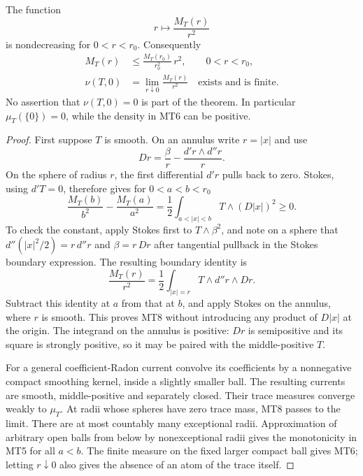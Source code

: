 \begin{theorem}
\label{thm:r13-protected-quadratic-trace-growth}
The function
\[
                         r\longmapsto\frac{M_T(r)}{r^2}
\tag{MT5}
\]
is nondecreasing for \(0<r<r_0\).  Consequently
\[
 \begin{split}
 M_T(r)&\le \frac{M_T(r_0)}{r_0^2}\,r^2,\qquad 0<r<r_0,\\
 \nu(T,0)&=\lim_{r\downarrow0}\frac{M_T(r)}{r^2}
                                      \quad\text{exists and is finite}.
 \end{split}
\tag{MT6}
\]
No assertion that \(\nu(T,0)=0\) is part of the theorem.
In particular \(\mu_T(\{0\})=0\), while the density
in MT6 can be positive.
\end{theorem}

\begin{proof}
First suppose \(T\) is smooth.  On an annulus write
\(r=|x|\) and use
\[
 D r=\frac{\beta}{r}
                -\frac{d'r\wedge d''r}{r}.
\tag{MT7}
\]
On the sphere of radius \(r\), the first differential
\(d'r\) pulls back to zero.  Stokes, using \(d'T=0\),
therefore gives for \(0<a<b<r_0\)
\[
 \frac{M_T(b)}{b^2}-\frac{M_T(a)}{a^2}
             =\frac12\int_{a<|x|<b}T\wedge(D|x|)^2\ge0.
\tag{MT8}
\]
To check the constant, apply Stokes first to
\(T\wedge\beta^2\), and note on a sphere that
\(d''(|x|^2/2)=r\,d''r\) and
\(\beta=r\,Dr\) after tangential pullback in
the Stokes boundary expression.  The resulting boundary
identity is
\[
 \frac{M_T(r)}{r^2}
       =\frac12\int_{|x|=r}T\wedge d''r\wedge Dr.
\]
Subtract this identity at \(a\) from that at \(b\),
and apply Stokes on the annulus, where \(r\) is smooth.
This proves MT8 without introducing any product of
\(D|x|\) at the origin.
The integrand on the annulus is positive: \(Dr\)
is semipositive and its square is strongly positive,
so it may be paired with the middle-positive \(T\).

For a general coefficient-Radon current convolve its
coefficients by a nonnegative compact smoothing kernel,
inside a slightly smaller ball.  The resulting currents
are smooth, middle-positive and separately closed.
Their trace measures converge weakly to \(\mu_T\).
At radii whose spheres have zero trace mass, MT8
passes to the limit.  There are at most countably
many exceptional radii.  Approximation of arbitrary
open balls from below by nonexceptional radii gives
the monotonicity in MT5 for all \(a<b\).  The finite
measure on the fixed larger compact ball gives MT6;
letting \(r\downarrow0\) also gives the absence of
an atom of the trace itself.
\end{proof}

